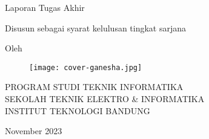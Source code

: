 \clearpage
\pagestyle{empty}

\begin{center}
    \smallskip
    
    \Large \bfseries \MakeUppercase{\thetitle}
    \vfill
    
    \Large Laporan Tugas Akhir
    \vfill
    
    \large Disusun sebagai syarat kelulusan tingkat sarjana
    \vfill
    
    \large Oleh
    
    \Large \theauthor
    
    \vfill
    \begin{figure}[h]
        \centering
        \texttt{[image: cover-ganesha.jpg]}
    \end{figure}
    \vfill
    
    \large
    \uppercase{
        Program Studi Teknik Informatika \\
        Sekolah Teknik Elektro \& Informatika \\
        Institut Teknologi Bandung
    }
    
    November 2023
    
\end{center}

\clearpage
